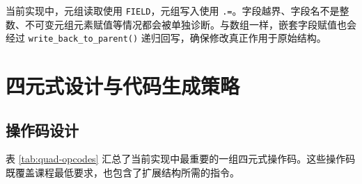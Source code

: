\documentclass[UTF8,a4paper,12pt]{ctexart}
\newcommand{\pkg}[1]{\texttt{#1}}
\newcommand{\op}[1]{\texttt{#1}}
\begin{document}
当前实现中，元组读取使用 \op{FIELD}，元组写入使用 \op{.=}。字段越界、字段名不是整数、不可变元组元素赋值等情况都会被单独诊断。与数组一样，嵌套字段赋值也会经过 \pkg{write\_back\_to\_parent()} 递归回写，确保修改真正作用于原始结构。

\section{四元式设计与代码生成策略}

\subsection{操作码设计}

表 \ref{tab:quad-opcodes} 汇总了当前实现中最重要的一组四元式操作码。这些操作码既覆盖课程最低要求，也包含了扩展结构所需的指令。
\end{document}
